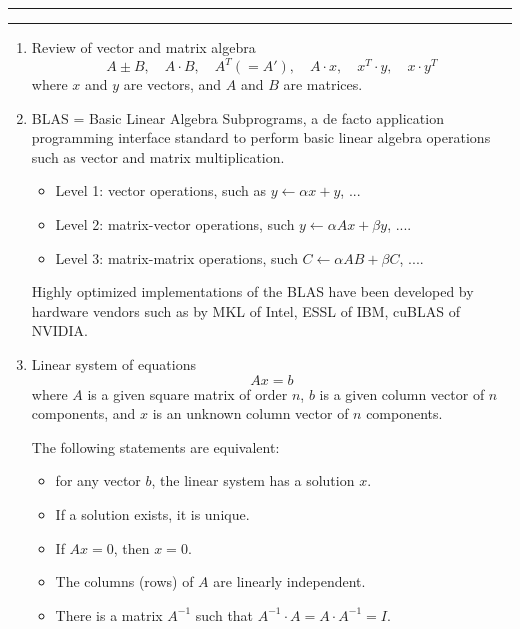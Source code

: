 \documentclass[11pt]{article}
\begin{document}
\hrule
\bigskip 
{}
\bigskip 
\hrule

\begin{enumerate}
\item Review of vector and matrix algebra 
      \[ 
       A\pm B, \quad A\cdot B, \quad A^T (= A'), \quad A\cdot x, \quad x^T\cdot  y, \quad x\cdot y^T
      \] 
where $x$ and $y$ are vectors, and $A$ and $B$ are matrices. 

\item BLAS = Basic Linear Algebra Subprograms, a de facto 
application programming interface standard to perform 
basic linear algebra operations such as vector and matrix multiplication. 

\begin{itemize} 

\item Level 1: vector operations, such as $y \leftarrow \alpha x + y$, ...

\item Level 2: matrix-vector operations, such 
        $y \leftarrow \alpha A x + \beta y$, ....

\item Level 3: matrix-matrix operations, such 
        $C \leftarrow \alpha A B + \beta C$, ....
\end{itemize} 
Highly optimized implementations of the BLAS have been developed 
by hardware vendors such as by MKL of Intel,  ESSL of IBM, cuBLAS of NVIDIA. 

\item Linear system of equations 
      \[
      A x = b
      \] 
     where $A$ is a given square matrix of order $n$, $b$
     is a given column vector of $n$ components, and 
     $x$ is an unknown column vector of $n$ components.

     The following statements are equivalent: 
      \begin{itemize} 
      \item for any vector $b$, the linear system has a solution $x$.  
      \item If a solution exists, it is unique.  
      \item If $Ax = 0$, then $x = 0$.   
      \item The columns (rows) of $A$ are linearly independent. 
      \item There is a matrix $A^{-1}$ such that 
             $A^{-1} \cdot A = A \cdot A^{-1} = I$. 
  

\end{itemize}
\end{enumerate}
\end{document}
